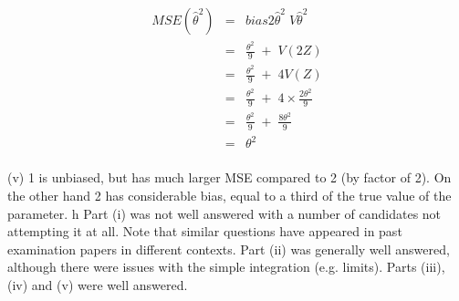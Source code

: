 \documentclass[a4paper,12pt]{article}
\begin{document}
\begin{eqnarray*}
MSE( \hat{\theta}^{2} ) 
&=& bias 2 \hat{\theta}^{2}  V \hat{\theta}^{2} \\
&=& \frac{\theta^2}{9} \; + \; V ( 2 Z ) \\
&=& \frac{\theta^2}{9} \; + \; 4V ( Z ) \\
&=& \frac{\theta^2}{9} \; + \; 4 \times \frac{2\theta^2}{9} \\
&=& \frac{\theta^2}{9} \; + \;  \frac{8\theta^2}{9} \\
&=& \theta^2 \\
\end{eqnarray*}


(v)
\hat{\theta} 1 is unbiased, but has much larger MSE compared to \hat{\theta} 2 (by factor of 2). 
On the other hand \hat{\theta} 2 has considerable bias, equal to a third of the true value
of the parameter.
h
Part (i) was not well answered with a number of candidates not
attempting it at all. Note that similar questions have appeared in past
examination papers in different contexts. Part (ii) was generally well
answered, although there were issues with the simple integration (e.g.
limits). Parts (iii), (iv) and (v) were well answered.
\end{document}
